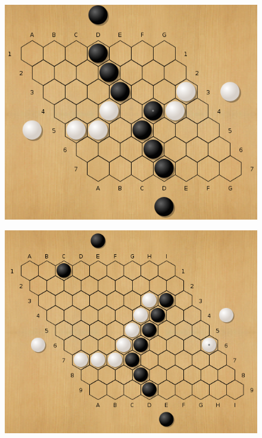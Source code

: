 \begin{figure}[h]
\centering
\begin{minipage}{.5\textwidth}
  \centering
  \includegraphics[scale=0.3]{images/hexbridge.png}
  \label{fig:hexstruct2}
\end{minipage}%
\begin{minipage}{.5\textwidth}
  \centering
  \includegraphics[scale=0.3]{images/hexladder.png}
  \label{fig:hexstruct1}
\end{minipage}
\end{figure}

